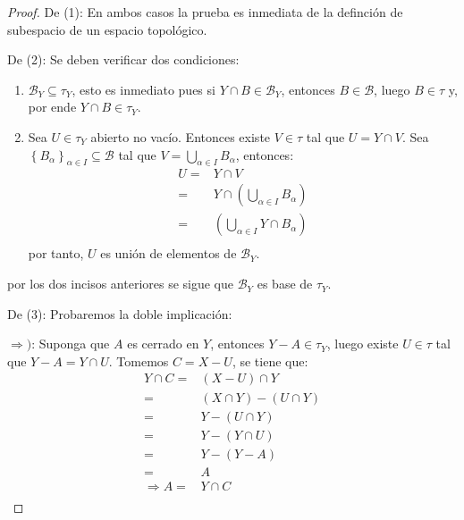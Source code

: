 \documentclass[12pt]{report}
\theoremstyle{largebreak}
\begin{document}
    \begin{proof}
        De (1): En ambos casos la prueba es inmediata de la definción de subespacio de un espacio topológico.

        De (2): Se deben verificar dos condiciones:
        \begin{enumerate}
            \item $\mathcal{B}_Y\subseteq\tau_Y$, esto es inmediato pues si $Y\cap B\in\mathcal{B}_Y$, entonces $B\in\mathcal{B}$, luego $B\in\tau$ y, por ende $Y\cap B\in\tau_Y$.
            \item Sea $U\in\tau_Y$ abierto no vacío. Entonces existe $V\in\tau$ tal que $U=Y\cap V$. Sea $\left\{B_\alpha \right\}_{\alpha\in I}\subseteq\mathcal{B}$ tal que $V=\bigcup_{\alpha\in I}B_\alpha$, entonces:
            \begin{equation*}
                \begin{split}
                    U=&Y\cap V\\
                =&Y\cap\left(\bigcup_{\alpha\in I}B_\alpha\right) \\
                =&\left(\bigcup_{\alpha\in I}Y\cap B_\alpha\right) \\
                \end{split}
            \end{equation*}
            por tanto, $U$ es unión de elementos de $\mathcal{B}_Y$.
        \end{enumerate}
        
        por los dos incisos anteriores se sigue que $\mathcal{B}_Y$ es base de $\tau_Y$.

        De (3): Probaremos la doble implicación:
        
        $\Rightarrow)$: Suponga que $A$ es cerrado en $Y$, entonces $Y-A\in\tau_Y$, luego existe $U\in\tau$ tal que $Y-A=Y\cap U$. Tomemos $C=X-U$, se tiene que:
        \begin{equation*}
            \begin{split}
                Y\cap C=&(X-U)\cap Y\\
                =&(X\cap Y)-(U\cap Y)\\
                =&Y-(U\cap Y)\\
                =&Y-(Y\cap U)\\
                =&Y-(Y-A)\\
                =&A\\
                \Rightarrow A=& Y\cap C\\
            \end{split}
        \end{equation*}


\end{proof}
\end{document}
